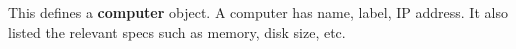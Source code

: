 This defines a \textbf{computer} object. A computer has name, label,
IP address. It also listed the relevant specs such as memory, disk size, etc.